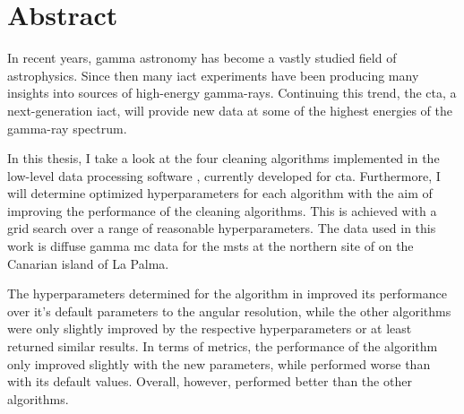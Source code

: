 \thispagestyle{plain}

\section*{Abstract}
In recent years, gamma astronomy has become a vastly studied field of astrophysics.
Since then many \gls{iact} experiments have been producing many insights into sources of
high-energy gamma-rays. Continuing this trend, the \gls{cta}, a next-generation \gls{iact},
will provide new data at some of the highest energies of the gamma-ray spectrum.

In this thesis, I take a look at the four cleaning algorithms implemented in the low-level data processing software \ctapipe{},
currently developed for \gls{cta}. Furthermore, I will determine optimized hyperparameters for each algorithm
with the aim of improving the performance of the cleaning algorithms. This is achieved with a grid search
over a range of reasonable hyperparameters. The data used in this work is diffuse gamma \gls{mc} data for
the \glspl{mst} at the northern site of \cta{} on the Canarian island of La Palma.

The hyperparameters determined for the \tcc{} algorithm in \ctapipe{} improved its performance over
it's default parameters \wrt to the angular resolution, while the other algorithms were only
slightly improved by the respective hyperparameters or at least returned similar results.
In terms of metrics, the performance of the \tcc{} algorithm only improved slightly with the new parameters, while \fact{}
performed worse than with its default values. Overall, however, \fact{} performed better than the other
algorithms.


